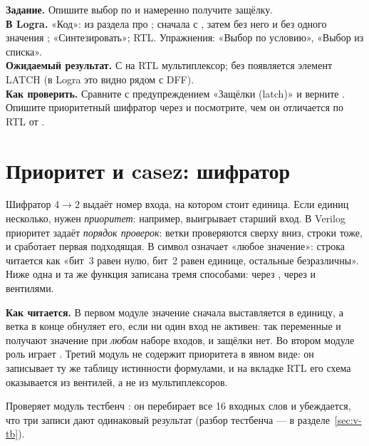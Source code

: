 \begin{diybox}
\textbf{Задание.} Опишите выбор по  и намеренно получите защёлку.\\
\textbf{В Logra.} «Код»:  из раздела про ; сначала с , затем без него и без одного значения ; «Синтезировать»; RTL. Упражнения: «Выбор по условию», «Выбор из списка».\\
\textbf{Ожидаемый результат.} С  на RTL мультиплексор; без  появляется элемент LATCH (в Logra это видно рядом с DFF).\\
\textbf{Как проверить.} Сравните с предупреждением «Защёлки (latch)» и верните .  Опишите приоритетный шифратор через  и посмотрите, чем он отличается по RTL от .
\end{diybox}

\section{Приоритет и casez: шифратор}
\label{sec:v-prio}

Шифратор $4\to2$ выдаёт номер входа, на котором стоит единица. Если единиц
несколько, нужен \emph{приоритет}: например, выигрывает старший вход. В
Verilog приоритет задаёт \emph{порядок проверок}: ветки 
проверяются сверху вниз, строки  тоже, и сработает первая
подходящая. В  символ  означает «любое значение»: строка
 читается как «бит~3 равен нулю, бит~2 равен единице, остальные
безразличны». Ниже одна и та же функция записана тремя способами: через
, через  и вентилями.


\textbf{Как читается.} В первом модуле значение  сначала
выставляется в единицу, а ветка  в конце обнуляет его, если ни один
вход не активен: так переменные  и  получают значение при
\emph{любом} наборе входов, и защёлки нет. Во втором модуле роль 
играет . Третий модуль не содержит приоритета в явном виде: он
записывает ту же таблицу истинности формулами, и на вкладке RTL его схема
оказывается из вентилей, а не из мультиплексоров.

Проверяет модуль тестбенч : он перебирает все 16 входных слов
и убеждается, что три записи дают одинаковый результат (разбор тестбенча ---
в разделе~\ref{sec:v-tb}).

